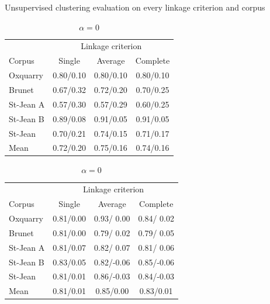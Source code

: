 \begin{table}
  \centering
  \caption{Unsupervised clustering evaluation on every linkage criterion and corpus}
  \label{tab:unsupervised_clustering}

  \caption{$\alpha = 0$}
  \label{tab:unsupervised_clustering_0}
  \begin{tabular}{l c c c}
    \toprule
           & \multicolumn{3}{c}{Linkage criterion} \\
    Corpus    & Single     & Average   & Complete \\
    \midrule
    Oxquarry  & 0.80/0.10 & 0.80/0.10 & 0.80/0.10 \\
    Brunet    & 0.67/0.32 & 0.72/0.20 & 0.70/0.25 \\
    St-Jean A & 0.57/0.30 & 0.57/0.29 & 0.60/0.25 \\
    St-Jean B & 0.89/0.08 & 0.91/0.05 & 0.91/0.05 \\
    St-Jean   & 0.70/0.21 & 0.74/0.15 & 0.71/0.17 \\
    \midrule
    Mean      & 0.72/0.20 & 0.75/0.16 & 0.74/0.16 \\
    \bottomrule
  \end{tabular}

  \label{tab:unsupervised_clustering_03}
  \begin{tabular}{l c c c}
    \toprule
           & \multicolumn{3}{c}{Linkage criterion} \\
    Corpus    & Single     & Average   & Complete \\
    \midrule
    Oxquarry  & 0.81/0.00 & 0.93/ 0.00 & 0.84/ 0.02 \\
    Brunet    & 0.81/0.00 & 0.79/ 0.02 & 0.79/ 0.05 \\
    St-Jean A & 0.81/0.07 & 0.82/ 0.07 & 0.81/ 0.06 \\
    St-Jean B & 0.83/0.05 & 0.82/-0.06 & 0.85/-0.06 \\
    St-Jean   & 0.81/0.01 & 0.86/-0.03 & 0.84/-0.03 \\
    \midrule
    Mean      & 0.81/0.01 & 0.85/0.00 & 0.83/0.01 \\
    \bottomrule
  \end{tabular}
\end{table}

